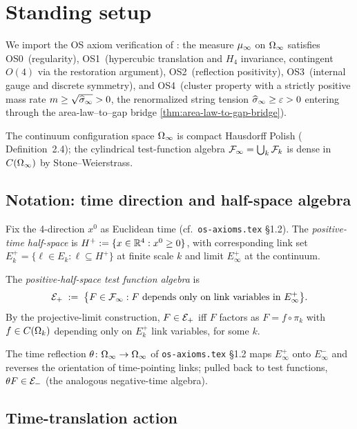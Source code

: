 \section{Standing setup}
\label{sec:os-reconstruction-setup}

We import the OS axiom verification of : the measure $\mu_\infty$ on $\Omega_\infty$ satisfies
OS0~(regularity), OS1~(hypercubic translation and $H_4$ invariance,
contingent $O(4)$ via the restoration argument),
OS2~(reflection positivity), OS3~(internal gauge and discrete
symmetry), and OS4~(cluster property with a strictly positive mass
rate $m \ge \sqrt{\widehat{\sigma}_\infty} > 0$, the renormalized string tension
$\widehat{\sigma}_\infty \ge \varepsilon > 0$ entering through the area-law--to--gap
bridge \cref{thm:area-law-to-gap-bridge}).

The continuum configuration space $\Omega_\infty$ is compact Hausdorff
Polish ( Definition~2.4); the
cylindrical test-function algebra $\mathcal{F}_\infty = \bigcup_k \mathcal{F}_k$
is dense in $C(\Omega_\infty)$ by Stone--Weierstrass.

\subsection{Notation: time direction and half-space algebra}
\label{subsec:half-space}

Fix the 4-direction $x^0$ as Euclidean time (cf.\ \texttt{os-axioms.tex}
\S1.2).  The \emph{positive-time half-space} is
$H^+ := \{ x \in \mathbb{R}^4 : x^0 \ge 0 \}$, with corresponding link set
$E_k^+ = \{ \ell \in E_k : \ell \subseteq H^+ \}$ at finite scale
$k$ and limit $E_\infty^+$ at the continuum.

The \emph{positive-half-space test function algebra} is
\begin{equation*}
  \mathcal{E}_+ \;:=\;
  \bigl\{ F \in \mathcal{F}_\infty : F \text{ depends only on link variables in } E_\infty^+ \bigr\}.
\end{equation*}
By the projective-limit construction, $F \in \mathcal{E}_+$ iff $F$ factors
as $F = f \circ \pi_k$ with $f \in C(\Omega_k)$ depending only on
$E_k^+$ link variables, for some $k$.

The time reflection $\theta \colon \Omega_\infty \to \Omega_\infty$ of
\texttt{os-axioms.tex} \S1.2 maps $E_\infty^+$ onto $E_\infty^-$ and
reverses the orientation of time-pointing links; pulled back to
test functions, $\theta F \in \mathcal{E}_-$ (the analogous negative-time
algebra).

\subsection{Time-translation action}
\label{subsec:time-translation}

